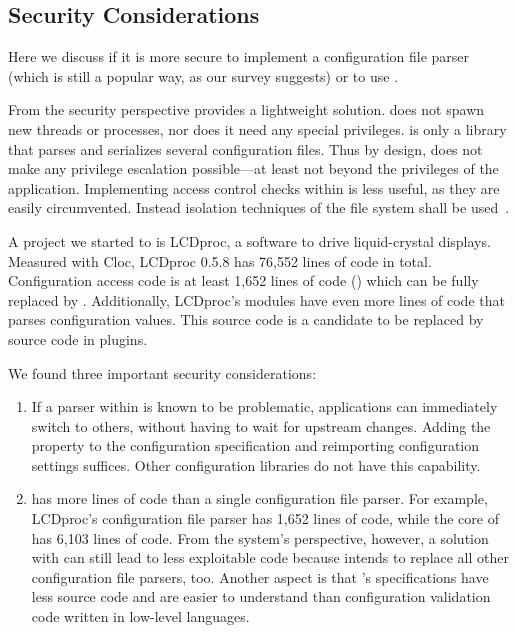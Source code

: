 \begin{code}[language=Cpp,firstnumber=19]
\subsection{Security Considerations}

Here we discuss if it is more secure to implement a configuration file parser (which is still a popular way, as our survey suggests) or to use \elektra{}.

From the security perspective  provides a lightweight solution.
 does not spawn new threads or processes, nor does it need any special privileges.
 is only a library that parses and serializes several configuration files.
Thus by design, \elektra{} does not make any privilege escalation possible---at least not beyond the privileges of the application.
Implementing access control checks within \elektra{} is less useful, as they are easily circumvented.
Instead isolation techniques of the file system shall be used~\cite{liang2003isolated}.

A project we started to  is LCDproc, a software to drive liquid-crystal displays.
Measured with Cloc, LCDproc 0.5.8 has 76,552 lines of code in total.
Configuration access code is at least 1,652 lines of code () which can be fully replaced by \elektra{}. %
Additionally, LCDproc's modules have even more lines of code that parses configuration values.
This source code is a candidate to be replaced by source code in plugins.

We found three important security considerations:
\begin{enumerate}
\item
If a parser within \elektra{} is known to be problematic, applications can immediately switch to others, without having to wait for upstream changes.
Adding the property  to the configuration specification and reimporting configuration settings suffices.
Other configuration libraries do not have this capability.

\item
\elektra{} has more lines of code than a single configuration file parser.
For example, LCDproc's configuration file parser has 1,652 lines of code, while the core of \elektra{} has 6,103 lines of code.
From the system's perspective, however, a solution with \elektra{} can still lead to less exploitable code because \elektra{} intends to replace all other configuration file parsers, too.
Another aspect is that 's specifications have less source code and are easier to understand than configuration validation code written in low-level languages.



\end{enumerate}
\end{code}
